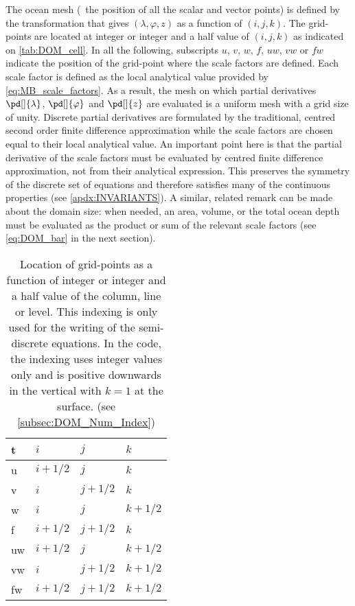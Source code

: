 \documentclass[../main/NEMO_manual]{subfiles}
\begin{document}
The ocean mesh (\ie\ the position of all the scalar and vector points) is defined by
the transformation that gives $(\lambda,\varphi,z)$ as a function of $(i,j,k)$.
The grid-points are located at integer or integer and a half value of $(i,j,k)$ as indicated on
\autoref{tab:DOM_cell}.
In all the following,
subscripts $u$, $v$, $w$, $f$, $uw$, $vw$ or $fw$ indicate the position of the grid-point where
the scale factors are defined.
Each scale factor is defined as the local analytical value provided by \autoref{eq:MB_scale_factors}.
As a result, the mesh on which partial derivatives $\pd[]{\lambda}$, $\pd[]{\varphi}$ and
$\pd[]{z}$ are evaluated is a uniform mesh with a grid size of unity.
Discrete partial derivatives are formulated by
the traditional, centred second order finite difference approximation while
the scale factors are chosen equal to their local analytical value.
An important point here is that the partial derivative of the scale factors must be evaluated by
centred finite difference approximation, not from their analytical expression.
This preserves the symmetry of the discrete set of equations and
therefore satisfies many of the continuous properties (see \autoref{apdx:INVARIANTS}).
A similar, related remark can be made about the domain size:
when needed, an area, volume, or the total ocean depth must be evaluated as
the product or sum of the relevant scale factors (see \autoref{eq:DOM_bar} in the next section).

\begin{table}
  \centering
  \begin{tabular}{|l|l|l|l|}
    \hline
    t   & $i      $ & $j      $ & $k      $ \\
    \hline
    u   & $i + 1/2$ & $j      $ & $k      $ \\
    \hline
    v   & $i      $ & $j + 1/2$ & $k      $ \\
    \hline
    w   & $i      $ & $j      $ & $k + 1/2$ \\
    \hline
    f   & $i + 1/2$ & $j + 1/2$ & $k      $ \\
    \hline
    uw  & $i + 1/2$ & $j      $ & $k + 1/2$ \\
    \hline
    vw  & $i      $ & $j + 1/2$ & $k + 1/2$ \\
    \hline
    fw  & $i + 1/2$ & $j + 1/2$ & $k + 1/2$ \\
    \hline
  \end{tabular}
  \caption[Location of grid-points]{
    Location of grid-points as a function of integer or
    integer and a half value of the column, line or level.
    This indexing is only used for the writing of the semi-discrete equations.
    In the code, the indexing uses integer values only and
    is positive downwards in the vertical with $k=1$ at the surface.
    (see \autoref{subsec:DOM_Num_Index})}
  \label{tab:DOM_cell}
\end{table}
\end{document}
